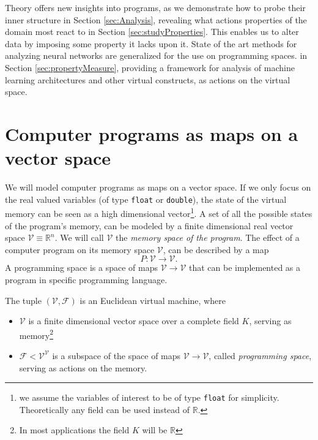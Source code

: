 \documentclass[smallcondensed]{svjour3}
\newcommand{\RR}{\mathbb{R}}
\newcommand{\VV}{\mathcal{V}}
\newcommand{\F}{\mathcal{F}}
\begin{document}
Theory offers new insights into programs, as we demonstrate how to probe their inner structure in Section \ref{sec:Analysis}, revealing what actions properties of the domain most react to in Section \ref{sec:studyProperties}. This enables us to alter data by imposing some property it lacks upon it.
State of the art methods for analyzing neural networks \cite{DeepDream} are generalized for the use on programming spaces. in Section \ref{sec:propertyMeasure}, providing a framework for analysis of machine learning architectures and other virtual constructs, as actions on the virtual space. 

\section{Computer programs as maps on a vector space}
We will model computer programs as maps on a vector space. If
we only focus on the real valued variables (of type \texttt{float} or
\texttt{double}),  the state of the virtual memory can be seen as a high
dimensional vector\footnote{we assume the variables of interest to be of type \texttt{float} for
  simplicity. Theoretically any field can be used instead of $\RR$.}. 
A set of all the possible states of the program's memory,
can be modeled by a finite dimensional real vector space $\VV\equiv \RR^n$. We
will call $\VV$ the \emph{memory space of the program}. The effect of a computer
program on its memory space $\VV$, can be described by a map
\begin{equation}
  \label{eq:map}
  P:\VV\to \VV.
\end{equation}
A programming space is a space of maps $\VV\to\VV$ that can be implemented as a
program in specific programming language. 
\begin{definition} The tuple $(\VV,\F)$ is an Euclidean virtual machine, where
  \begin{itemize}
  \item
  $\VV$ is a finite dimensional vector space over a complete field $K$, serving
  as memory\footnote{In most applications the field $K$ will
    be $\RR$}
  \item
  $\F< \VV^\VV$ is a subspace of the space of maps $\VV\to \VV$, called \emph{programming space}, serving as actions on the memory.
  \end{itemize}  
\end{definition}
\end{document}
